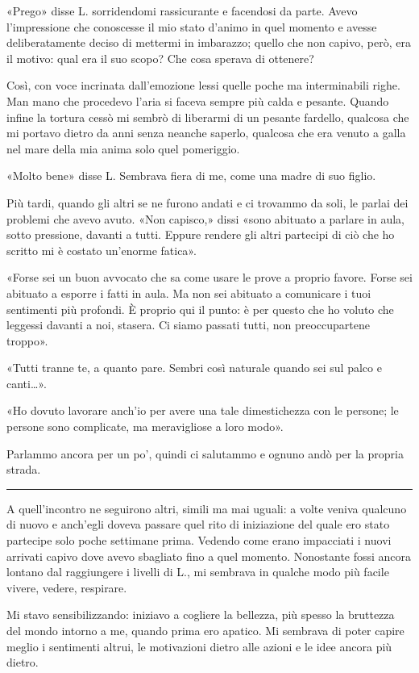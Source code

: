 \documentclass[a4paper,10pt]{memoir}
\begin{document}
«Prego» disse L. sorridendomi rassicurante e facendosi da parte. Avevo l'impressione che conoscesse il mio stato d'animo
in quel momento e avesse deliberatamente deciso di mettermi in imbarazzo; quello che non capivo, però, era il motivo:
qual era il suo scopo? Che cosa sperava di ottenere?

Così, con voce incrinata dall'emozione lessi quelle poche ma interminabili righe. Man mano che procedevo l'aria si
faceva sempre più calda e pesante. Quando infine la tortura cessò mi sembrò di liberarmi di un pesante fardello,
qualcosa che mi portavo dietro da anni senza neanche saperlo, qualcosa che era venuto a galla nel mare della mia anima
solo quel pomeriggio.

«Molto bene» disse L. Sembrava fiera di me, come una madre di suo figlio.

Più tardi, quando gli altri se ne furono andati e ci trovammo da soli, le parlai dei problemi che avevo avuto. «Non
capisco,» dissi «sono abituato a parlare in aula, sotto pressione, davanti a tutti. Eppure rendere gli altri partecipi
di ciò che ho scritto mi è costato un'enorme fatica».

«Forse sei un buon avvocato che sa come usare le prove a proprio favore. Forse sei abituato a esporre i fatti in aula.
Ma non sei abituato a comunicare i tuoi sentimenti più profondi. È proprio qui il punto: è per questo che ho voluto che
leggessi davanti a noi, stasera. Ci siamo passati tutti, non preoccupartene troppo».

«Tutti tranne te, a quanto pare. Sembri così naturale quando sei sul palco e
canti\dots{}».

«Ho dovuto lavorare anch'io per avere una tale dimestichezza con le persone; le persone sono complicate, ma meravigliose
a loro modo».

Parlammo ancora per un po', quindi ci salutammo e ognuno andò per la propria strada.

\plainbreak{1}

A quell'incontro ne seguirono altri, simili ma mai uguali: a volte veniva qualcuno di nuovo e anch'egli doveva passare
quel rito di iniziazione del quale ero stato partecipe solo poche settimane prima. Vedendo come erano impacciati i nuovi
arrivati capivo dove avevo sbagliato fino a quel momento. Nonostante fossi ancora lontano dal raggiungere i livelli di
L., mi sembrava in qualche modo più facile vivere, vedere, respirare.

Mi stavo sensibilizzando: iniziavo a cogliere la bellezza, più spesso la bruttezza del mondo intorno a me, quando prima
ero apatico. Mi sembrava di poter capire meglio i sentimenti altrui, le motivazioni dietro alle azioni e le idee ancora
più dietro.
\end{document}
